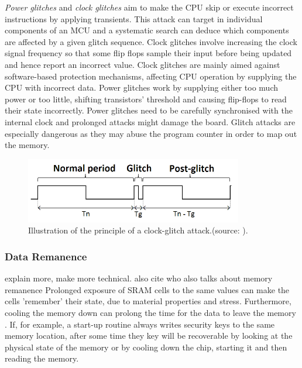 		\emph{Power glitches} and \emph{clock glitches} aim to make the CPU skip or execute incorrect instructions by applying transients. This attack can target in individual components of an MCU and a systematic search can deduce which components are affected by a given glitch sequence. Clock glitches involve increasing the clock signal frequency so that some flip flops sample their input before being updated and hence report an incorrect value. Clock glitches are mainly aimed against software-based protection mechanisms, affecting CPU operation by supplying the CPU with incorrect data.	Power glitches work by supplying either too much power or too little, shifting transistors' threshold and causing flip-flops to read their state incorrectly. Power glitches need to be carefully synchronised with the internal clock and prolonged attacks might damage the board. Glitch attacks are especially dangerous as they may abuse the program counter in order to map out the memory\citep{glitches_paper}\citep{anderson:cautionary_note}\citep{sergei:thesis}.

	\begin{figure}
		\center
		\includegraphics[scale=0.7]{img/clock_glitch.png}
		\caption{\footnotesize Illustration of the principle of a clock-glitch attack.(source: \protect\citep{glitches_paper}).}
		\label{fig:glitch}		
	\end{figure}

	\subsubsection{Data Remanence}
	{\color{red} explain more, make more technical. also cite \citep{website:ibm_secure} who also talks about memory remanence}
	Prolonged exposure of SRAM cells to the same values can make the cells 'remember' their state, due to material properties and stress\citep{gutman:memory_remanence}. Furthermore, cooling the memory down can prolong the time for the data to leave the memory \citep{gutman:memory_remanence}\citep{sergei:RAM}\citep{sergei:thesis}. If, for example, a start-up routine always writes security keys to the same memory location, after some time they key will be recoverable by looking at the physical state of the memory or by cooling down the chip, starting it and then reading the memory.
	
